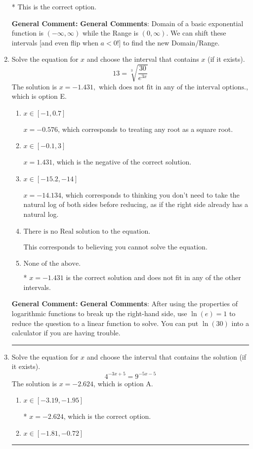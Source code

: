 \documentclass{extbook}[14pt]
\newcommand{\litem}[1]{\item #1

\rule{\textwidth}{0.4pt}}
\begin{document}
\begin{enumerate}
{\begin{enumerate}[label=\Alph*.]
* This is the correct option.
\end{enumerate}

\textbf{General Comment:} \textbf{General Comments}: Domain of a basic exponential function is $(-\infty, \infty)$ while the Range is $(0, \infty)$. We can shift these intervals [and even flip when $a<0$!] to find the new Domain/Range.
}
\litem{
 Solve the equation for $x$ and choose the interval that contains $x$ (if it exists).
\[  13 = \sqrt[3]{\frac{30}{e^{3x}}} \]
The solution is \( x = -1.431, \text{ which does not fit in any of the interval options.} \), which is option E.\begin{enumerate}[label=\Alph*.]
\item \( x \in [-1, 0.7] \)

$x = -0.576$, which corresponds to treating any root as a square root.
\item \( x \in [-0.1, 3] \)

$x = 1.431$, which is the negative of the correct solution.
\item \( x \in [-15.2, -14] \)

$x = -14.134$, which corresponds to thinking you don't need to take the natural log of both sides before reducing, as if the right side already has a natural log.
\item \( \text{There is no Real solution to the equation.} \)

This corresponds to believing you cannot solve the equation.
\item \( \text{None of the above.} \)

* $x = -1.431$ is the correct solution and does not fit in any of the other intervals.
\end{enumerate}

\textbf{General Comment:} \textbf{General Comments}: After using the properties of logarithmic functions to break up the right-hand side, use $\ln(e) = 1$ to reduce the question to a linear function to solve. You can put $\ln(30)$ into a calculator if you are having trouble.
}
\litem{
Solve the equation for $x$ and choose the interval that contains the solution (if it exists).
\[ 4^{-3x+5} = 9^{-5x-5} \]
The solution is \( x = -2.624 \), which is option A.\begin{enumerate}[label=\Alph*.]
\item \( x \in [-3.19, -1.95] \)

* $x = -2.624$, which is the correct option.
\item \( x \in [-1.81, -0.72] \)


\end{enumerate}}
\end{enumerate}
\end{document}
